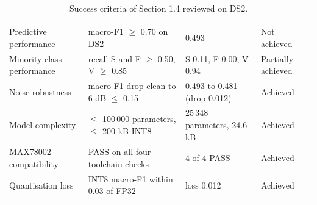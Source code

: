 \begin{table}[H]
  \centering
  \caption{Success criteria of Section 1.4 reviewed on DS2.}
  \label{tab:criteria-review}
  \begin{tabularx}{\linewidth}{lYYl}
     &  &  &  \\
    Predictive performance & macro-F1 $\geq$ 0.70 on DS2 & 0.493 & Not achieved \\
    Minority class performance & recall S and F $\geq$ 0.50, V $\geq$ 0.85 & S 0.11, F 0.00, V 0.94 & Partially achieved \\
    Noise robustness & macro-F1 drop clean to 6 dB $\leq$ 0.15 & 0.493 to 0.481 (drop 0.012) & Achieved \\
    Model complexity & $\leq$ 100\,000 parameters, $\leq$ 200 kB INT8 & 25\,348 parameters, 24.6 kB & Achieved \\
    MAX78002 compatibility & PASS on all four toolchain checks & 4 of 4 PASS & Achieved \\
    Quantisation loss & INT8 macro-F1 within 0.03 of FP32 & loss 0.012 & Achieved \\
    \bottomrule
  \end{tabularx}
\end{table}
